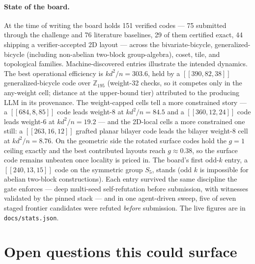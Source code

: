 \documentclass[11pt]{article}
\newcommand{\eff}{kd^2/n}
\begin{document}
	\paragraph{State of the board.} At the time of writing the board holds
	151 verified codes --- 75 submitted through the challenge and 76
	literature baselines, 29 of them certified exact, 44 shipping a
	verifier-accepted 2D layout --- across the bivariate-bicycle,
	generalized-bicycle (including non-abelian two-block group-algebra),
	coset, tile, and topological families. Machine-discovered entries
	illustrate the intended dynamics. The best operational efficiency is
	$\eff = 303.6$, held by a $[[390,82,38]]$ generalized-bicycle code over
	$\mathbb{Z}_{195}$ (weight-32 checks, so it competes only in the
	any-weight cell; distance at the upper-bound tier) attributed to the
	producing LLM in its provenance. The weight-capped cells tell a more
	constrained story --- a $[[684,8,85]]$ code leads weight-8 at
	$\eff=84.5$ and a $[[360,12,24]]$ code leads weight-6 at $\eff=19.2$ ---
	and the 2D-local cells a more constrained one still: a $[[263,16,12]]$
	grafted planar bilayer code leads the bilayer weight-8 cell at
	$\eff=8.76$. On the geometric side the rotated surface codes hold the
	$g=1$ ceiling exactly and the best contributed layouts reach
	$g\approx0.38$, so the surface code remains unbeaten once locality is
	priced in. The board's first odd-$k$ entry, a $[[240,13,15]]$ code on
	the symmetric group $S_5$, stands (odd $k$ is impossible for abelian
	two-block constructions). Each entry survived the same discipline the
	gate enforces --- deep multi-seed self-refutation before submission,
	with witnesses validated by the pinned stack --- and in one
	agent-driven sweep, five of seven staged frontier candidates were
	refuted \emph{before} submission. The live figures are in
	\texttt{docs/stats.json}.

	\section{Open questions this could surface}
\end{document}
